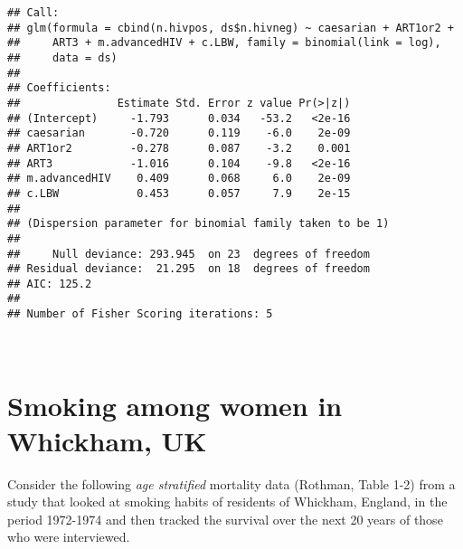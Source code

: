 \documentclass[landscape,twocolumn,letterpaper,9pt,reqno]{article}\usepackage[]{graphicx}\usepackage[]{color}
\newenvironment{knitrout}{}{} %
\begin{document}
\begin{knitrout}\small
{}\color{fgcolor}
\begin{verbatim}
## Call:
## glm(formula = cbind(n.hivpos, ds$n.hivneg) ~ caesarian + ART1or2 + 
##     ART3 + m.advancedHIV + c.LBW, family = binomial(link = log), 
##     data = ds)
## 
## Coefficients:
##               Estimate Std. Error z value Pr(>|z|)
## (Intercept)     -1.793      0.034   -53.2   <2e-16
## caesarian       -0.720      0.119    -6.0    2e-09
## ART1or2         -0.278      0.087    -3.2    0.001
## ART3            -1.016      0.104    -9.8   <2e-16
## m.advancedHIV    0.409      0.068     6.0    2e-09
## c.LBW            0.453      0.057     7.9    2e-15
## 
## (Dispersion parameter for binomial family taken to be 1)
## 
##     Null deviance: 293.945  on 23  degrees of freedom
## Residual deviance:  21.295  on 18  degrees of freedom
## AIC: 125.2
## 
## Number of Fisher Scoring iterations: 5
\end{verbatim}

\end{knitrout}


\clearpage

\textcolor{white}{text}

\clearpage

\section{Smoking among women in Whickham, UK}
Consider the following \textit{age stratified} mortality data (Rothman, Table 1-2) from a study that looked at smoking habits of residents of Whickham, England, in the period 1972-1974 and then tracked the survival over the next 20 years of those who were interviewed. 
\end{document}

